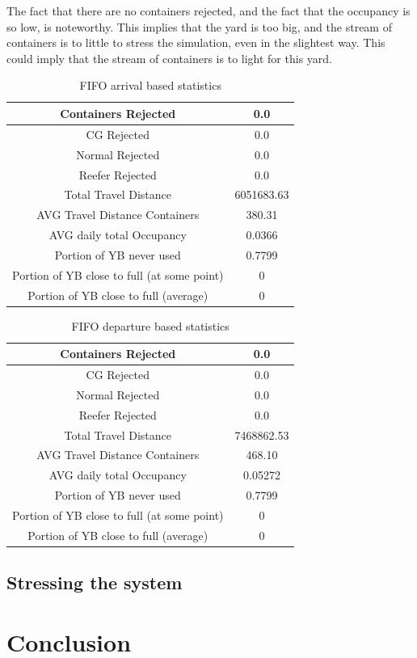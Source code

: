 \documentclass[]{article}
\begin{document}
The fact that there are no containers rejected, and the fact that the occupancy
is so low, is noteworthy. This implies that the yard is too big, and the stream
of containers is to little to stress the simulation, even in the slightest way.
This could imply that the stream of containers is to light for this yard.
\begin{table}[h]
	\centering
	\begin{tabular}{|c|c|}
		\hline
		Containers Rejected                         & 0.0        \\ \hline
		CG Rejected                                 & 0.0        \\ \hline
		Normal Rejected                             & 0.0        \\ \hline
		Reefer Rejected                             & 0.0        \\ \hline
		Total Travel Distance                       & 6051683.63 \\ \hline
		AVG Travel Distance Containers              & 380.31     \\ \hline
		AVG daily total Occupancy                   & 0.0366     \\ \hline
		Portion of YB never used                    & 0.7799     \\ \hline
		Portion of YB close to full (at some point) & 0          \\ \hline
		Portion of YB close to full (average)       & 0          \\ \hline
	\end{tabular}
	\caption{FIFO arrival based statistics}
\end{table}
\begin{table}[h]
	\centering
	\begin{tabular}{|c|c|}
		\hline
		Containers Rejected                         & 0.0        \\ \hline
		CG Rejected                                 & 0.0        \\ \hline
		Normal Rejected                             & 0.0        \\ \hline
		Reefer Rejected                             & 0.0        \\ \hline
		Total Travel Distance                       & 7468862.53 \\ \hline
		AVG Travel Distance Containers              & 468.10     \\ \hline
		AVG daily total Occupancy                   & 0.05272    \\ \hline
		Portion of YB never used                    & 0.7799     \\ \hline
		Portion of YB close to full (at some point) & 0          \\ \hline
		Portion of YB close to full (average)       & 0          \\ \hline
	\end{tabular}
	\caption{FIFO departure based statistics}
\end{table}

\subsection{Stressing the system}
\section{Conclusion}
\end{document}
